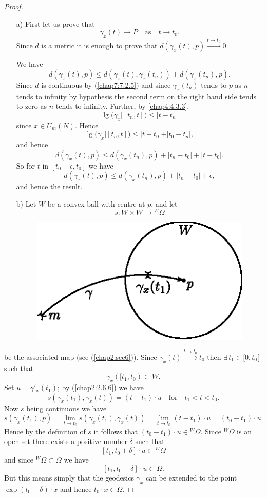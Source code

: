 \begin{proof}
\begin{itemize}
\item[a)] First \pageoriginale let us prove that
$$
\gamma_{x}(t)\to P\quad\text{as}\quad t\to t_{0}.
$$
Since $d$ is a metric it is enough to prove that
$d(\gamma_{x}(t),p)\xrightarrow{t\to t_{0}} 0$.

We have
$$
d(\gamma_{x}(t),p)\leq
d(\gamma_{x}(t),\gamma_{x}(t_{n}))+d(\gamma_{x}(t_{n}),p). 
$$
Since $d$ is continuous by (\ref{chap7:7.2.5}) and since
$\gamma_{x}(t_{n})$ tends to $p$ as $n$ tends to infinity by
hypothesis the second term on the right hand side tends to zero as $n$
tends to infinity. Further, by \eqref{chap4:4.3.3}, 
$$
\lg(\gamma_{x}|[t_{n},t])\leq |t-t_{n}|
$$
since $x\in U_{m}(N)$. Hence
$$
\lg(\gamma_{x}|[t_{n},t])\leq |t-t_{0}|+|t_{0}-t_{n}|,
$$
and hence
$$
d(\gamma_{x}(t),p)\leq d(\gamma_{x}(t_{n}),p)+|t_{n}-t_{0}|+|t-t_{0}|.
$$
So for $t$ in $[t_{0}-\epsilon,t_{0}]$ we have
$$
d(\gamma_{x}(t),p)\leq d(\gamma_{x}(t_{n}),p)+|t_{n}-t_{0}|+\epsilon,
$$
and hence the result.

\item[b)] Let $W$ be a convex ball with centre at $p$, and let
$$
s:W\times W\to {}^{W}\Omega
$$
\begin{figure}[H]
\centering
\includegraphics{figures/chap7-fig2.eps}
\end{figure}
\end{itemize}
be the associated map (see (\ref{chap2:sec6})). Since
$\gamma_{x}(t)\xrightarrow{t\to t_{0}} t_{0}$ then \pageoriginale
$\exists\, t_{1}\in[0,t_{0}[$ such that
$$
\gamma_{x}([t_{1},t_{0})\subset W.
$$
Set $u=\gamma'_{x}(t_{1})$; by (\ref{chap2:2.6.6}) we have
$$
s(\gamma_{x}(t_{1}), \gamma_{x}(t))=(t-t_{1})\cdot
u\quad\text{for}\quad t_{1}<t<t_{0}. 
$$
Now $s$ being continuous we have
$$
s(\gamma_{x}(t_{1}),p)=\lim\limits_{t\to
  t_{0}}s(\gamma_{x}(t_{1}),\gamma_{x}(t))=\lim\limits_{t\to
  t_{0}}(t-t_{1})\cdot u=(t_{0}-t_{1})\cdot u.
$$
Hence by the definition of $s$ it follows that $(t_{0}-t_{1})\cdot
u\in {}^{W}\Omega$. Since ${}^{W}\Omega$ is an open set there exists a
positive number $\delta$ such that
$$
[t_{1},t_{0}+\delta]\cdot u\subset{}^{W}\Omega
$$
and since ${}^{W}\Omega\subset\Omega$ we have
$$
[t_{1},t_{0}+\delta]\cdot u\subset\Omega.
$$
But this means simply that the geodesics $\gamma_{x}$ can be extended
to the point $\exp(t_{0}+\delta)\cdot x$ and hence $t_{0}\cdot x\in\Omega$.
\end{proof}

